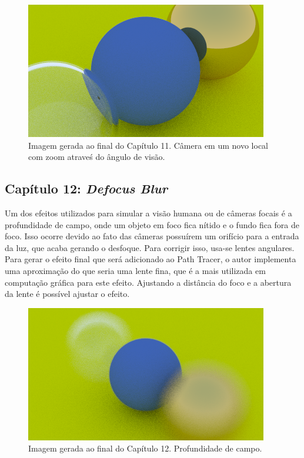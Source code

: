 \documentclass[journal]{IEEEtran}
\begin{document}
\begin{figure}[ht]
  \centering
  \includegraphics[width=\linewidth]{media/img-1.19-view-zoom.png}
  \caption{Imagem gerada ao final do Capítulo 11. Câmera em um novo local com zoom atraveś do
  ângulo de visão.}
  \label{img_cam}
\end{figure}


\subsection*{Capítulo 12: \emph{Defocus Blur}}
Um dos efeitos utilizados para simular a visão humana ou de câmeras focais é a profundidade de campo, onde
um objeto em foco fica nítido e o fundo fica fora de foco. Isso ocorre devido ao fato das câmeras possuírem
um orifício para a entrada da luz, que acaba gerando o desfoque. Para corrigir isso, usa-se lentes angulares.
Para gerar o efeito final que será adicionado ao Path Tracer, o autor implementa uma aproximação do que seria
uma lente fina, que é a mais utilizada em computação gráfica para este efeito. Ajustando a distância do foco
e a abertura da lente é possível ajustar o efeito.

\begin{figure}[ht]
  \centering
  \includegraphics[width=\linewidth]{media/img-1.20-depth-of-field.png}
  \caption{Imagem gerada ao final do Capítulo 12. Profundidade de campo.}
  \label{img_dof}
\end{figure}
\end{document}
